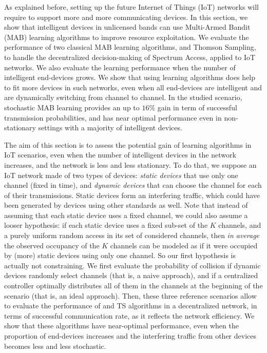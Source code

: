 
\graphicspath{{2-Chapters/4-Chapter/CrownCom_17.git/}}

As explained before, setting up the future Internet of Things (IoT) networks will require to support more and more communicating devices.
In this section, we show that intelligent devices in unlicensed bands can use Multi-Armed Bandit (MAB) learning algorithms to improve resource exploitation.
%
We evaluate the performance of two classical MAB learning algorithms, \UCB{} and Thomson Sampling, to handle the decentralized decision-making of Spectrum Access, applied to IoT networks. We also evaluate the learning performance when the number of intelligent end-devices grows.
%
We show that using learning algorithms does help to fit more devices in such networks, even when all end-devices are intelligent and are dynamically switching from channel to channel.
In the studied scenario, stochastic MAB learning provides an up to $16\%$ gain in term of successful transmission probabilities, and has near optimal performance even in non-stationary settings with a majority of intelligent devices.



The aim of this section is to assess the potential gain of learning algorithms in IoT scenarios, even when the number of intelligent devices in the network increases,
and the network is less and less stationary.
To do that, we suppose an IoT network made of two types of devices: \emph{static devices} that use only one channel (fixed in time), and \emph{dynamic devices} that can choose the channel for each of their transmissions. Static devices form an interfering traffic, which could have been generated by devices using other standards as well.
Note that instead of assuming that each static device uses a fixed channel, we could also assume a looser hypothesis: if each static device uses a fixed sub-set of the $K$ channels, and a purely uniform random access in its set of considered channels, then \emph{in average} the observed occupancy of the $K$ channels can be modeled as if it were occupied by (more) static devices using only one channel. So our first hypothesis is actually not constraining.
We first evaluate the probability of collision if dynamic devices randomly select channels (that is, a naive approach), and if a centralized controller optimally distributes all of them in the channels at the beginning of the scenario (that is, an ideal approach).
Then, these three reference scenarios allow to evaluate the performance of \UCB{} and TS algorithms in a decentralized network, in terms of successful communication rate, as it reflects the network efficiency.
We show that these algorithms have near-optimal performance, even when the proportion of end-devices increases and the interfering traffic from other devices becomes less and less stochastic.


